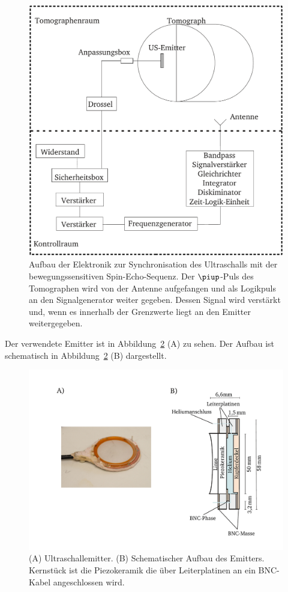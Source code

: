 \documentclass[
    11pt,
    ngerman
]{scrreprt}
\begin{document}
\begin{figure}[htbp]
    \centering
    \includegraphics[width=.75\textwidth]{Abbildungen/elektronik.pdf}
    \caption{%
        Aufbau der Elektronik zur Synchronisation des Ultraschalls mit der bewegungssensitiven Spin-Echo-Sequenz. Der $\piup$-Puls des Tomographen wird von der Antenne aufgefangen und als Logikpuls an den Signalgenerator weiter gegeben. Dessen Signal wird verstärkt und, wenn es innerhalb der Grenzwerte liegt an den Emitter weitergegeben.
    }
    \label{fig:elektronik}
\end{figure}

Der verwendete Emitter ist in Abbildung~\ref{fig:emitter} (A) zu sehen. Der Aufbau ist schematisch in Abbildung~\ref{fig:emitter} (B) dargestellt.

\begin{figure}
    \centering
    \includegraphics[width=.8\textwidth]{Abbildungen/emitter.pdf}
    \caption{(A) Ultraschallemitter. (B) Schematischer Aufbau des Emitters. Kernstück ist die Piezokeramik die über Leiterplatinen an ein BNC-Kabel angeschlossen wird.}
    \label{fig:emitter}
\end{figure}
\end{document}

